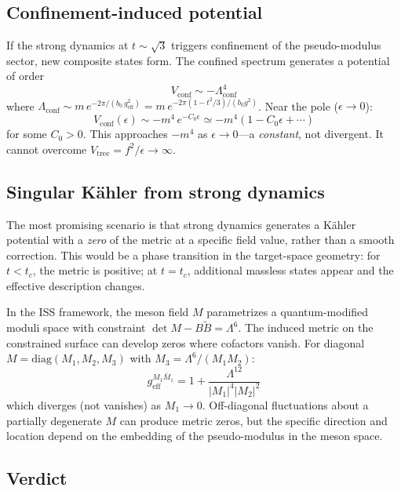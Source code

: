 \subsection{Confinement-induced potential}

If the strong dynamics at $t \sim \sqrt{3}$ triggers confinement of the pseudo-modulus
sector, new composite states form. The confined spectrum generates a
potential of order
\begin{equation}
V_{\text{conf}} \sim -\Lambda_{\text{conf}}^4
\end{equation}
where $\Lambda_{\text{conf}} \sim m\,e^{-2\pi/(b_0\,g_{\text{eff}}^2)}
= m\,e^{-2\pi(1-t^2/3)/(b_0 g^2)}$.
Near the pole ($\epsilon \to 0$):
\begin{equation}
V_{\text{conf}}(\epsilon) \sim -m^4\,e^{-C_0\epsilon}
\simeq -m^4(1 - C_0\epsilon + \cdots)
\end{equation}
for some $C_0 > 0$. This approaches $-m^4$ as $\epsilon \to 0$---a \emph{constant},
not divergent. It cannot overcome $V_{\text{tree}} = f^2/\epsilon \to \infty$.

\subsection{Singular K\"ahler from strong dynamics}

The most promising scenario is that strong dynamics generates a K\"ahler potential
with a \emph{zero} of the metric at a specific field value, rather than a smooth correction.
This would be a phase transition in the target-space geometry:
for $t < t_c$, the metric is positive; at $t = t_c$, additional massless states appear
and the effective description changes.

In the ISS framework, the meson field $M$ parametrizes a quantum-modified moduli space
with constraint $\det M - B\tilde B = \Lambda^6$.
The induced metric on the constrained surface can develop zeros where cofactors vanish.
For diagonal $M = \text{diag}(M_1, M_2, M_3)$ with $M_3 = \Lambda^6/(M_1 M_2)$:
\begin{equation}
g_{\text{eff}}^{M_1 \bar M_1} = 1 + \frac{\Lambda^{12}}{|M_1|^4|M_2|^2}
\end{equation}
which diverges (not vanishes) as $M_1 \to 0$. Off-diagonal fluctuations
about a partially degenerate $M$ can produce metric zeros, but the specific
direction and location depend on the embedding of the pseudo-modulus
in the meson space.

\subsection{Verdict}

